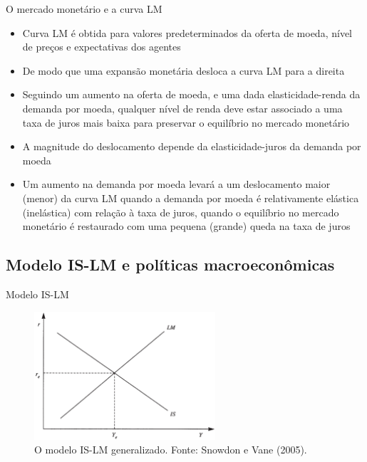 \documentclass[10pt]{beamer}
\begin{document}
\begin{frame}{O mercado monetário e a curva LM}
    \begin{itemize}
        \item Curva LM é obtida para valores predeterminados da oferta de moeda, nível de preços e expectativas dos agentes
        \bigskip
        \item De modo que uma expansão monetária desloca a curva LM para a direita
        \bigskip
        \item Seguindo um aumento na oferta de moeda, e uma dada elasticidade-renda da demanda por moeda, qualquer nível de renda deve estar associado a uma taxa de juros mais baixa para preservar o equilíbrio no mercado monetário
        \bigskip
        \item A magnitude do deslocamento depende da elasticidade-juros da demanda por moeda
        \bigskip
        \item Um aumento na demanda por moeda levará a um deslocamento maior (menor) da curva LM quando a demanda por moeda é relativamente elástica (inelástica) com relação à taxa de juros, quando o equilíbrio no mercado monetário é restaurado com uma pequena (grande) queda na taxa de juros
    \end{itemize}
\end{frame}

\subsection{Modelo IS-LM e políticas macroeconômicas}
\begin{frame}{Modelo IS-LM}
    \begin{figure}
        \centering
        \includegraphics[width=0.6\textwidth]{./figures/aula06_fig2.PNG}
        \caption{O modelo IS-LM generalizado. Fonte: Snowdon e Vane (2005).}
        \label{fig2}
    \end{figure}
\end{frame}
\end{document}
